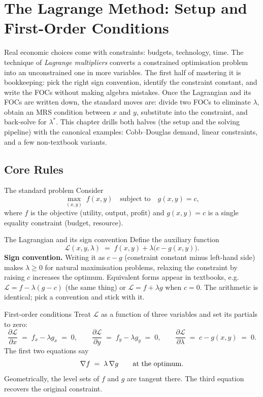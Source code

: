 \chapter{The Lagrange Method: Setup and First-Order Conditions}

Real economic choices come with constraints: budgets, technology, time. The
technique of \emph{Lagrange multipliers} converts a constrained optimisation
problem into an unconstrained one in more variables. The first half of
mastering it is bookkeeping: pick the right sign convention, identify the
constraint constant, and write the FOCs without making algebra mistakes.
Once the Lagrangian and its FOCs are written down, the standard moves are:
divide two FOCs to eliminate $\lambda$, obtain an MRS condition between $x$
and $y$, substitute into the constraint, and back-solve for $\lambda^*$.
This chapter drills both halves (the setup and the solving pipeline)
with the canonical examples: Cobb--Douglas demand, linear constraints, and a
few non-textbook variants.

\section{Core Rules}

\begin{rulebox}{The standard problem}
Consider
\[
\max_{(x, y)} \; f(x, y) \quad \text{subject to} \quad g(x, y) = c,
\]
where $f$ is the objective (utility, output, profit) and $g(x, y) = c$ is a
single equality constraint (budget, resource).
\end{rulebox}

\begin{rulebox}{The Lagrangian and its sign convention}
Define the auxiliary function
\[
\mathcal{L}(x, y, \lambda) \;=\; f(x, y) + \lambda \bigl( c - g(x, y) \bigr).
\]
\textbf{Sign convention.} Writing it as $c - g$ (constraint constant minus
left-hand side) makes $\lambda \geq 0$ for natural maximisation problems,
relaxing the constraint by raising $c$ increases the optimum. Equivalent
forms appear in textbooks, e.g.\ $\mathcal{L} = f - \lambda(g - c)$ (the
same thing) or $\mathcal{L} = f + \lambda g$ when $c = 0$. The arithmetic is
identical; pick a convention and stick with it.
\end{rulebox}

\begin{rulebox}{First-order conditions}
Treat $\mathcal{L}$ as a function of three variables and set its partials to
zero:
\[
\frac{\partial \mathcal{L}}{\partial x} \;=\; f_x - \lambda g_x \;=\; 0, \qquad
\frac{\partial \mathcal{L}}{\partial y} \;=\; f_y - \lambda g_y \;=\; 0, \qquad
\frac{\partial \mathcal{L}}{\partial \lambda} \;=\; c - g(x, y) \;=\; 0.
\]
The first two equations say
\[
\nabla f \;=\; \lambda \, \nabla g \qquad \text{at the optimum.}
\]
Geometrically, the level sets of $f$ and $g$ are tangent there. The third
equation recovers the original constraint.
\end{rulebox}

